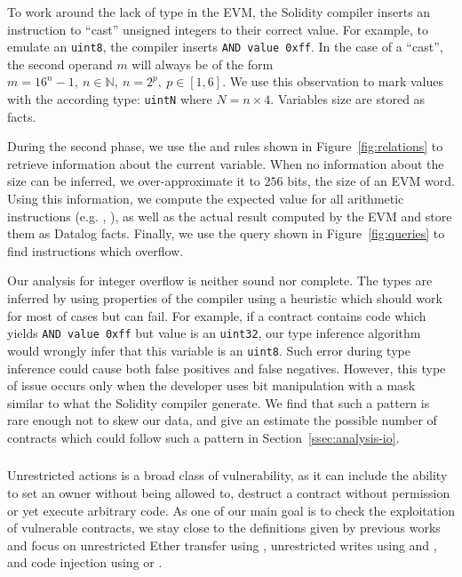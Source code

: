 To work around the lack of type in the EVM, the Solidity compiler inserts an  instruction to ``cast'' unsigned integers to their correct value. For example, to emulate an \lstinline{uint8}, the compiler inserts \lstinline{AND value 0xff}. In the case of a ``cast'', the second operand $m$ will always be of the form $m = 16^n - 1,~n\in \mathbb{N},~n = 2^p,~p \in [1, 6]$. We use this observation to mark values with the according type: \lstinline{uintN} where $N = n \times 4$. Variables size are stored as  facts.

During the second phase, we use the  and  rules shown in Figure~\ref{fig:relations} to retrieve information about the current variable. When no information about the size can be inferred, we over-approximate it to $256$ bits, the size of an EVM word. Using this information, we compute the expected value for all arithmetic instructions (e.g. , ), as well as the actual result computed by the EVM and store them as Datalog facts. Finally, we use the query shown in Figure~\ref{fig:queries} to find instructions which overflow.

\correctness Our analysis for integer overflow is neither sound nor complete. The types are inferred by using properties of the compiler using a heuristic which should work for most of cases but can fail. For example, if a contract contains code which yields \lstinline{AND value 0xff} but value is an \lstinline{uint32}, our type inference algorithm would wrongly infer that this variable is an \lstinline{uint8}. Such error during type inference could cause both false positives and false negatives. However, this type of issue occurs only when the developer uses bit manipulation with a mask similar to what the Solidity compiler generate. We find that such a pattern is rare enough not to skew our data, and give an estimate the possible number of contracts which could follow such a pattern in Section~\ref{ssec:analysis-io}.

\subsubsection{\unrestrictedaction}
\label{ssec:method-ua}
Unrestricted actions is a broad class of vulnerability, as it can include the ability to set an owner without being allowed to, destruct a contract without permission or yet execute arbitrary code.
As one of our main goal is to check the exploitation of vulnerable contracts, we stay close to the definitions given by previous works~\cite{Krupp2018} and focus on unrestricted Ether transfer using , unrestricted writes using and , and code injection using  or .


